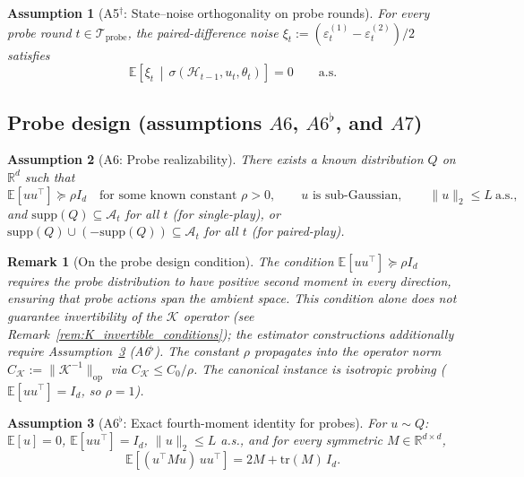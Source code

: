 \documentclass[12pt]{article}
\newcommand{\R}{\mathbb{R}}
\newcommand{\E}{\mathbb{E}}
\newcommand{\op}{\mathrm{op}}
\newcommand{\cA}{\mathcal{A}}
\newcommand{\cH}{\mathcal{H}}
\newcommand{\cTprobe}{\mathcal{T}_{\mathrm{probe}}}
\newcommand{\supp}{\mathrm{supp}}
\newcommand{\tr}{\mathrm{tr}}
\newtheorem{assumption}{Assumption}
\newtheorem{remark}{Remark}
\theoremstyle{plain}
\theoremstyle{definition}
\begin{document}
\begin{assumption}[A5$^\dagger$: State--noise orthogonality on probe rounds]
\label{assum:state_noise_orth}
For every probe round $t \in \cTprobe$, the paired-difference noise $\xi_t := (\varepsilon_t^{(1)} - \varepsilon_t^{(2)})/2$ satisfies
\[
\E\!\left[\xi_t \,\middle|\, \sigma(\cH_{t-1}, u_t, \theta_t)\right] = 0 \qquad \text{a.s.}
\]
\end{assumption}

\subsection{\texorpdfstring{Probe design (assumptions $A6$, $A6^\flat$, and $A7$)}{Probe design (assumptions A6, A6 flat, and A7)}}

\begin{assumption}[A6: Probe realizability]
\label{assum:probe_realizability}
There exists a known distribution $Q$ on $\R^d$ such that
\[
\E[uu^\top] \succeq \rho I_d
\quad \text{for some known constant } \rho > 0,
\qquad
u \text{ is sub-Gaussian},
\qquad
\|u\|_2 \le L \ \text{a.s.},
\]
and $\supp(Q) \subseteq \cA_t$ for all $t$ (for single-play), or $\supp(Q) \cup (-\supp(Q)) \subseteq \cA_t$ for all $t$ (for paired-play).
\end{assumption}

\begin{remark}[On the probe design condition]
The condition $\E[uu^\top] \succeq \rho I_d$ requires the probe distribution to have positive second moment in every direction, ensuring that probe actions span the ambient space. This condition alone does not guarantee invertibility of the $\mathcal{K}$ operator (see Remark~\ref{rem:K_invertible_conditions}); the estimator constructions additionally require Assumption~\ref{assum:fourth_moment} (A6$^\flat$). The constant $\rho$ propagates into the operator norm $C_{\mathcal{K}} := \|\mathcal{K}^{-1}\|_{\op}$ via $C_{\mathcal{K}} \le C_0 / \rho$. The canonical instance is isotropic probing ($\E[uu^\top] = I_d$, so $\rho = 1$).
\end{remark}

\begin{assumption}[A6$^\flat$: Exact fourth-moment identity for probes]
\label{assum:fourth_moment}
For $u \sim Q$: $\E[u] = 0$, $\E[uu^\top] = I_d$, $\|u\|_2 \le L$ a.s., and for every symmetric $M \in \R^{d \times d}$,
\begin{equation}
\E\!\left[(u^\top M u)\, uu^\top\right] = 2M + \tr(M)\, I_d.
\label{eq:A6flat}
\end{equation}
\end{assumption}
\end{document}
